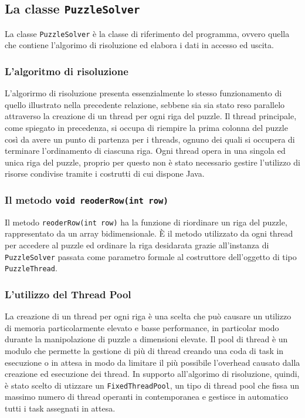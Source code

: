 \subsection{La classe \texttt{PuzzleSolver}}
La classe \texttt{PuzzleSolver} è la classe di riferimento del programma, ovvero quella che contiene l'algorimo di risoluzione ed elabora
i dati in accesso ed uscita.


\subsubsection{L'algoritmo di risoluzione}
L'algorirmo di risoluzione presenta essenzialmente lo stesso funzionamento di quello illustrato nella precedente relazione, sebbene sia sia stato reso parallelo
attraverso la creazione di un thread per ogni riga del puzzle.
Il thread principale, come spiegato in precedenza, si occupa di riempire la prima colonna del puzzle così da avere un punto di partenza per i threads, ognuno dei
quali si occupera di terminare l'ordinamento di ciascuna riga.
Ogni thread opera in una singola ed unica riga del puzzle, proprio per questo non è stato necessario gestire l'utilizzo di risorse condivise tramite i costrutti
di cui dispone Java.


\subsubsection{Il metodo \texttt{void reoderRow(int row)}}
Il metodo \texttt{reoderRow(int row)} ha la funzione di riordinare un riga del puzzle, rappresentato da un array bidimensionale.
\`{E} il metodo utilizzato da ogni thread per accedere al puzzle ed ordinare la riga desidarata  grazie all'instanza di \texttt{PuzzleSolver}
passata come parametro formale al costruttore dell'oggetto di tipo \texttt{PuzzleThread}.


\subsubsection{L'utilizzo del Thread Pool}
La creazione di un thread per ogni riga è una scelta che può causare un utilizzo di memoria particolarmente elevato e basse performance, in particolar modo durante la manipolazione
di puzzle a dimensioni elevate.
Il pool di thread è un modulo che permette la gestione di più di thread creando una coda di task in esecuzione o in attesa in modo da limitare il più possibile
l'overhead causato dalla creazione ed esecuzione dei thread.
In supporto all'algorimo di risoluzione, quindi, è stato scelto di utizzare un \texttt{FixedThreadPool}, un tipo di thread pool che fissa un massimo numero di thread
operanti in contemporanea e gestisce in automatico tutti i task assegnati in attesa.

